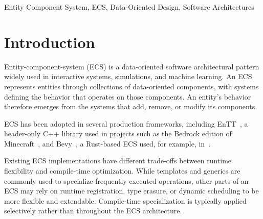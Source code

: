 \documentclass[conference]{IEEEtran}
\begin{document}
    \begin{abstract}
        The Entity-Component-System (ECS) pattern is used for applications in interactive systems,
        machine learning, and digital simulation contexts.
        From examining existing infrastructure and tools, such as EnTT, Bevy Engine, and the Unity Data-Oriented Technology Stack (DOTS), and comparing to theoretical models,
        we identified opportunities to reduce ECS runtime overhead and increase performance through increased compile-time specialization.
        We present KAWA, an ECS framework built upon C++ that aggressively applies compile-time
        metaprogramming techniques to reduce overhead and analyze the potential of this approach.
        The framework was evaluated in comparison with EnTT
        and Bevy in terms of performance, executable size, and memory usage.
        The results showed that our framework has comparable performance to existing frameworks while
        improving program size at an acceptable cost to memory usage in tested workloads.
    \end{abstract}

    \begin{IEEEkeywords}
        Entity Component System, ECS, Data-Oriented Design, Software Architectures
    \end{IEEEkeywords}


    \section{Introduction}
    \label{sec:introduction}
    Entity-component-system (ECS) is a data-oriented software architectural pattern widely used in interactive systems, simulations, and machine learning.
    An ECS represents entities through collections of data-oriented components, with systems defining the behavior that operates on those components.
    An entity's behavior therefore emerges from the systems that add, remove, or modify its components.

    ECS has been adopted in several production frameworks, including EnTT~\cite{ValtoLibraries_EnTT}, a header-only C++ library used in projects such as the Bedrock edition of Minecraft~\cite{mojang_minecraft_attribution},
    and Bevy~\cite{Bevy_Engine}, a Rust-based ECS used, for example, in~\cite{machine-learning-bevy}.

    Existing ECS implementations have different trade-offs between runtime flexibility and compile-time optimization.
    While templates and generics are commonly used to specialize frequently executed operations,
    other parts of an ECS may rely on runtime registration, type erasure, or dynamic scheduling to be more flexible and extendable.
    Compile-time specialization is typically applied selectively rather than throughout the ECS architecture.
\end{document}
